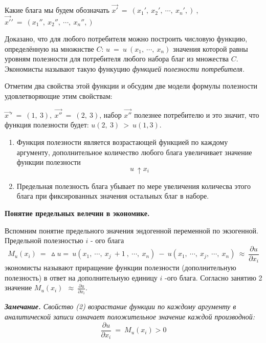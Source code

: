 \documentclass[12pt,a4paper]{article}
\begin{document}
Какие блага мы будем обозначать $\displaystyle \overrightarrow{x'} \ =\ ( x_{1} ',\ x_{2} ',\ \cdots ,\ x_{n} ',) \ $, $\displaystyle \overrightarrow{x'} '\ =\ ( x_{1} '',\ x_{2} '',\ \cdots ,\ x_{n} '',) \ $



	Доказано, что для любого потребителя можно построить числовую функцию, определённую на множнстве $\displaystyle C$: $\displaystyle u\ =\ u\ ( x_{1} ,\ \cdots ,\ x_{n})$ значения которой равны уровням полезности для потребителя любого набора благ из множества $\displaystyle C$. Экономисты называют такую функуцию \textit{функцией полезности потребителя. }

	Отметим два свойства этой функции и обсудим две модели формулы полезности удовлетворяющие этим свойствам:

$\displaystyle \overrightarrow{x\ } '\ =\ ( 1,\ 3) ,\ \overrightarrow{x''} \ =\ ( 2,\ 3)$, набор $\displaystyle \overrightarrow{x''}$ полезнее потребителю и это значит, что функция полезности будет: $\displaystyle u( 2,\ 3) \  >\ u( 1,3) .$
\begin{enumerate}
\item {Функция полезности является возрастающей функцией по каждому аргументу, дополнительное количество любого блага увеличивает значение функции полезности
\begin{equation}
u\ \uparrow x_{i}
\end{equation}}
\item Предельная полезность блага убывает по мере увеличения количесва этого блага при фиксированных значения остальных благ в наборе.
\end{enumerate}
\begin{center}
\textbf{Понятие предельных велечин в экономике.}
\end{center}
	Вспомним понятие предельного значения эндогенной переменной по экзогенной. Предельной полезностью $\displaystyle i$ - ого блага
\begin{equation}
M_{u}( x_{i}) \ =\ \vartriangle u=\ u( x_{1} ,\ \cdots ,\ x_{j} \ +1\ ,\ \cdots ,\ x_{n}) \ -\ u( x_{1} ,\ \cdots ,\ x_{j} ,\ \cdots ,\ x_{n}) \ \approx \ \frac{\partial u}{\partial x_{i}}
\end{equation}
экономисты называют приращение функции полезности (дополнительную полезность) в ответ на дополнительную единицу $\displaystyle i$ -ого блага. Согласно занятию 2 значение $\displaystyle M_{u}( x_{i}) \ \ \approx \ \frac{\partial u}{\partial x_{i}}$.

	\textit{\textbf{Замечание. }Свойство (2) возрастание функции по каждому аргументу в аналитической записи означает положительное значение каждой производной: }
\begin{equation}
\frac{\partial u}{\partial x_{i}} \ =\ M_{u}( x_{i})  >0
\end{equation}
\end{document}
